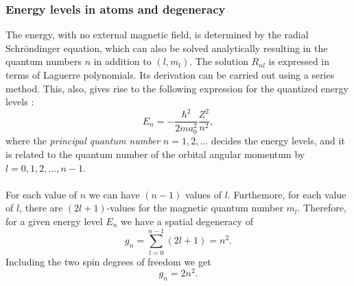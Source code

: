 \subsubsection{Energy levels in atoms and degeneracy}
The energy, with no external magnetic field, is determined by the radial Schr\"ondinger equation, which 
can also be solved analytically resulting in the quantum numbers 
$n$ in addition to $(l,m_l)$. The solution $R_{nl}$ is expressed in terms of Laguerre polynomials. Its derivation can be carried out using a series method. This, also, gives rise to the following expression for the quantized energy levels \cite{Hammond}:
\begin{equation}\label{atomsEnergy}
\boxed{E_n = -\frac{\hbar^ 2}{2 m a_{0}^{2}} \frac{Z^2}{n^2},}
\end{equation}
where the \emph{principal quantum number} $n = 1, 2, \ldots$ decides the energy levels, and it is related to the quantum number of the orbital angular momentum by $l = 0, 1, 2, \ldots, n - 1$.\\
\\
\noindent
For each value of $n$ we can have $(n-1)$ values of $l$. Furthemore, for each value of $l$, there are $(2l + 1)$-values for the magnetic quantum number $m_l$. Therefore, for a given energy level $E_n$ we have a spatial degeneracy of 
\begin{equation}
\boxed{g_n = \sum_{l=0}^{n-1}(2 l + 1) = n^2.}
\end{equation}
Including the two spin degrees of freedom we get 
\begin{equation}
 \boxed{g_n = 2 n^2.}
\end{equation}



